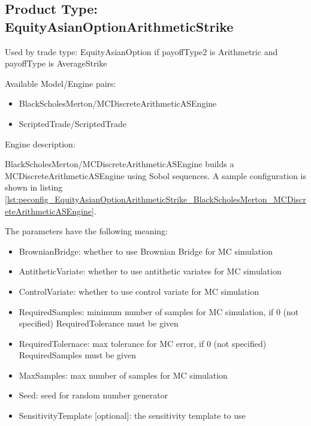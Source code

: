 \subsection{Product Type: EquityAsianOptionArithmeticStrike}

Used by trade type: EquityAsianOption if payoffType2 is Arithmetric and payoffType is AverageStrike

Available Model/Engine pairs:

\begin{itemize}
\item BlackScholesMerton/MCDiscreteArithmeticASEngine
\item ScriptedTrade/ScriptedTrade
\end{itemize}
  
Engine description:

BlackScholesMerton/MCDiscreteArithmeticASEngine builds a MCDiscreteArithmeticASEngine using Sobol sequences. A sample
configuration is shown in listing
\ref{lst:peconfig_EquityAsianOptionArithmeticStrike_BlackScholesMerton_MCDiscreteArithmeticASEngine}.

The parameters have the following meaning:

\begin{itemize}
\item BrownianBridge: whether to use Brownian Bridge for MC simulation
\item AntitheticVariate: whether to use antithetic variates for MC simulation
\item ControlVariate: whether to use control variate for MC simulation
\item RequiredSamples: minimum number of samples for MC simulation, if 0 (not specified) RequiredTolerance must be given
\item RequiredTolernace: max tolerance for MC error, if 0 (not specified) RequiredSamples must be given
\item MaxSamples: max number of samples for MC simulation
\item Seed: seed for random number generator
\item SensitivityTemplate [optional]: the sensitivity template to use 
\end{itemize}

